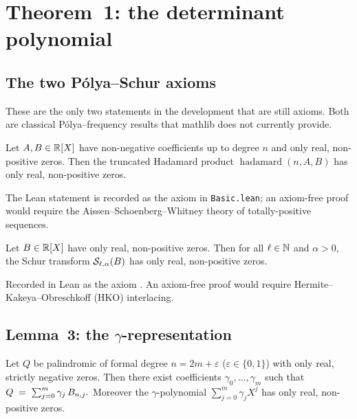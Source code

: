 \chapter{Theorem~1: the determinant polynomial}
\label{ch:theorem1}

\section{The two Pólya--Schur axioms}

These are the only two statements in the development that are still
axioms.  Both are classical Pólya--frequency results that mathlib does
not currently provide.

\begin{lemma}
  \label{lem:hadamard_closure}
  \leanok
  Let $A, B \in \mathbb{R}[X]$ have non-negative coefficients up to degree $n$
  and only real, non-positive zeros.  Then the truncated Hadamard product
  $\operatorname{hadamard}(n, A, B)$ has only real, non-positive zeros.
\end{lemma}

The Lean statement is recorded as the axiom
in \texttt{Basic.lean}; an axiom-free proof would require the
Aissen--Schoenberg--Whitney theory of totally-positive sequences.

\begin{lemma}
  \label{lem:schur_preserves_nonpos}
  \leanok
  Let $B \in \mathbb{R}[X]$ have only real, non-positive zeros.  Then for all
  $\ell \in \mathbb{N}$ and $\alpha > 0$, the Schur transform
  $\mathcal{S}_{\ell,\alpha}(B)$ has only real, non-positive zeros.
\end{lemma}

Recorded in Lean as the axiom
.  An axiom-free proof
would require Hermite--Kakeya--Obreschkoff (HKO) interlacing.

\section{Lemma~3: the \texorpdfstring{$\gamma$}{gamma}-representation}

\begin{lemma}
  \label{lem:gamma_representation}
  \leanok
  Let $Q$ be palindromic of formal degree $n = 2m + \varepsilon$
  ($\varepsilon \in \{0,1\}$) with only real, strictly negative zeros.
  Then there exist coefficients $\gamma_0, \ldots, \gamma_m$ such that
  \(
    Q \;=\; \sum_{j=0}^{m} \gamma_j\, B_{n,j}.
  \)
  Moreover the $\gamma$-polynomial
  $\sum_{j=0}^{m}\gamma_jX^j$ has only real, non-positive zeros.
\end{lemma}


